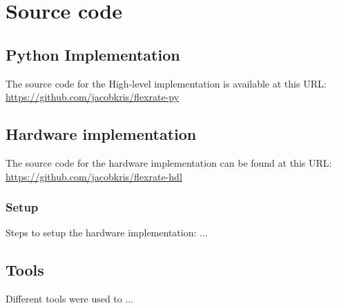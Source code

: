 \chapter{Source code} \label{app:source_code}

\section{Python Implementation}
The source code for the High-level implementation is available at this URL: \url{https://github.com/jacobkris/flexrate-py}

\section{Hardware implementation}
The source code for the hardware implementation can be found at this URL:
\url{https://github.com/jacobkris/flexrate-hdl}

\subsection{Setup}
Steps to setup the hardware implementation:
...

\section{Tools}
Different tools were used to ...